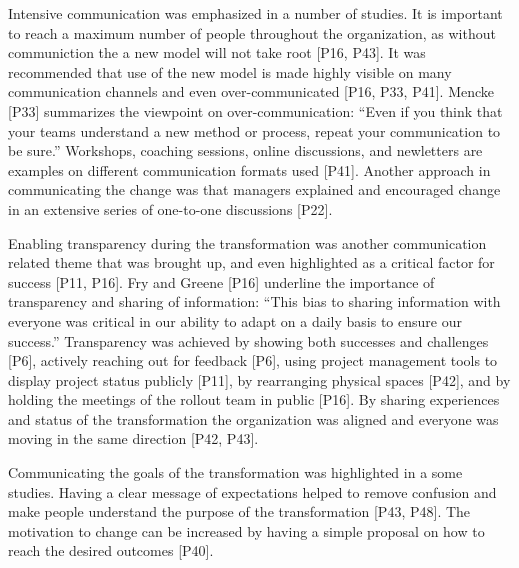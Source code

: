 \documentclass[preprint,authoryear,12pt]{elsarticle}
\begin{document}
Intensive communication was emphasized in a number of studies. It is important
to reach a maximum number of people throughout the organization, as without
communiction the a new model will not take root [P16, P43].
It was recommended that use of the new model is made highly visible on many
communication channels and even over-communicated [P16, P33, P41]. Mencke [P33]
summarizes the viewpoint on over-communication: ``Even if you think that your
teams understand a new method or process, repeat your communication to be
sure.'' Workshops, coaching sessions, online discussions, and newletters are
examples on different communication formats used [P41]. Another approach in
communicating the change was that managers explained and encouraged change in an
extensive series of one-to-one discussions [P22].

Enabling transparency during the transformation was another communication
related theme that was brought up, and even highlighted as a critical factor for
success [P11, P16]. Fry and Greene [P16] underline the importance of
transparency and sharing of information: ``This bias to sharing information with
everyone was critical in our ability to adapt on a daily basis to ensure our
success.'' Transparency was achieved by showing both successes and challenges
[P6], actively reaching out for feedback [P6], using project management tools to
display project status publicly [P11], by rearranging physical spaces [P42], and
by holding the meetings of the rollout team in public [P16].
By sharing experiences and status of the transformation the organization was
aligned and everyone was moving in the same direction [P42, P43].






Communicating the goals of the transformation was highlighted in a some studies.
Having a clear message of expectations helped to remove confusion and make
people understand the purpose of the transformation [P43, P48]. The motivation
to change can be increased by having a simple proposal on how to reach the
desired outcomes [P40].
\end{document}
